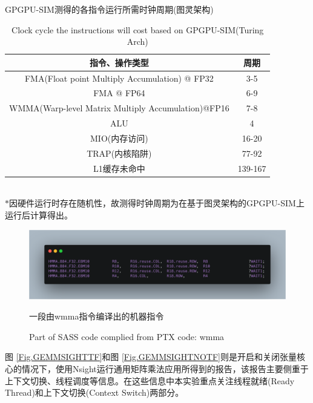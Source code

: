 \begin{table}
	\centering
	\renewcommand{\thetable}{\arabic{section}-\arabic{table} }
	\renewcommand{\tablename}{表}
	\caption{GPGPU-SIM测得的各指令运行所需时钟周期(图灵架构)}
	\addtocounter{table}{-1}
	\renewcommand{\thetable}{\arabic{section}-\arabic{table} }
	\renewcommand{\tablename}{Table}
	\caption{Clock cycle the instructions will cost based on GPGPU-SIM(Turing Arch)}
	\begin{tabular}{cc}
		\toprule
		指令、操作类型	&	周期\\
		\midrule
		FMA(Float point Multiply Accumulation) @ FP32 & 3-5 \\
		FMA @ FP64	&	6-9\\
		WMMA(Warp-level Matrix Multiply Accumulation)@FP16 & 7-8\\
		ALU 	&	4\\
		MIO(内存访问) & 16-20\\
		TRAP(内核陷阱) & 77-92\\
		L1缓存未命中 & 139-167\\
		\bottomrule
	\end{tabular} \label{table-时钟周期} \\
	
	$ * $因硬件运行时存在随机性，故测得时钟周期为在基于图灵架构的GPGPU-SIM上运行后计算得出。
\end{table}
\begin{figure}
	\centering
	\includegraphics[width=15cm]{figures/HMMASASS.jpg}
	\renewcommand{\thefigure}{\arabic{section}-\arabic{figure} }
	\renewcommand{\figurename}{图}
	\caption{一段由wmma指令编译出的机器指令}
	\addtocounter{figure}{-1}
	\renewcommand{\thefigure}{\arabic{section}-\arabic{figure} }
	\renewcommand{\figurename}{Figure}
	\caption{Part of SASS code complied from PTX code: wmma}
	\label{Fig.HMMASASS}
\end{figure}
\par 图 \ref{Fig.GEMMSIGHTTF}和图 \ref{Fig.GEMMSIGHTNOTF}则是开启和关闭张量核心的情况下，使用Nsight运行通用矩阵乘法应用所得到的报告，该报告主要侧重于上下文切换、线程调度等信息。在这些信息中本实验重点关注线程就绪(Ready Thread)和上下文切换(Context Switch)两部分。

